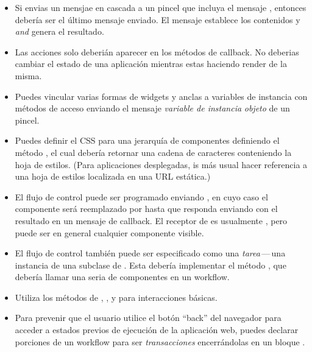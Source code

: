 \documentclass[a4paper,10pt,twoside]{book}
\begin{document}
\begin{itemize}
  \item Si envias un mensjae en cascada a un pincel que incluya el mensaje , entonces  deber\'ia ser el \'ultimo mensaje enviado.
  El mensaje  establece los contenidos y \emph{and} genera el resultado.
  \item Las acciones solo deberi\'an aparecer en los m\'etodos de callback.
No deberias cambiar el estado de una aplicaci\'on mientras estas haciendo render de la misma.
  \item Puedes vincular varias formas de widgets y anclas a variables de instancia con m\'etodos de acceso enviando el mensaje  \emph{variable de instancia}  \emph{objeto} de un pincel.
  \item Puedes definir el CSS para una jerarqu\'ia de componentes definiendo el m\'etodo , el cual deber\'ia retornar una cadena de caracteres conteniendo la hoja de estilos.
  (Para aplicaciones desplegadas, is m\'as usual hacer referencia a una hoja de estilos localizada en una URL est\'atica.)
  \item El flujo de control puede ser programado enviando , en cuyo caso el componente  ser\'a reemplazado por  hasta que  responda enviando  con el resultado en un mensaje de callback.
  El receptor de  es usualmente , pero puede ser en general cualquier componente visible.
  \item El flujo de control tambi\'en puede ser especificado como una \emph{tarea}\,---\,una instancia de una subclase de . 
Esta deber\'ia implementar el m\'etodo , que deber\'ia llamar una seria de componentes en un workflow.
  
\item Utiliza los m\'etodos de  , ,  y  para interacciones b\'asicas.
  \item Para prevenir que el usuario utilice el bot\'on ``back'' del navegador para acceder a estados previos de ejecuci\'on de la aplicaci\'on web, 
puedes declarar porciones de un workflow para ser \emph{transacciones} encerr\'andolas en un bloque .
\end{itemize}

\ifx\wholebook\relax\else 
   
   
\end{document}
